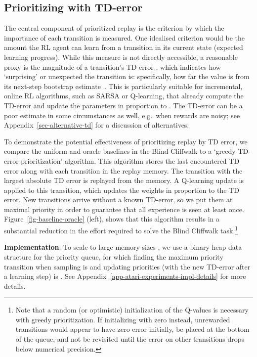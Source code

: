 \documentclass[a4paper]{article}
\begin{document}
\subsection{Prioritizing with TD-error}
The central component of prioritized replay is the criterion by which the importance of each transition is measured. 
One idealised criterion would be the amount the RL agent
can learn from a transition in its current state (expected learning progress). 
While this measure is not directly accessible, a reasonable proxy is the magnitude of 
a transition's TD error , which indicates how `surprising' or unexpected the transition is: specifically, how far the value is from its next-step bootstrap estimate~\citep{gen-sweeping}.
This is particularly suitable for incremental, online RL algorithms, such as SARSA or Q-learning, that already compute the TD-error and update
the parameters in proportion to .
The TD-error can be a poor estimate in some circumstances as well, e.g.~when rewards are noisy; 
see Appendix~\ref{sec-alternative-td} for a discussion of alternatives.


To demonstrate the potential effectiveness of prioritizing replay by TD error, 
we compare the uniform and oracle baselines in the Blind Cliffwalk to 
a `greedy TD-error prioritization' algorithm. This algorithm stores the last encountered TD error along with each transition in the replay memory. The transition with the largest absolute TD error is replayed from the memory. A Q-learning update is applied to this transition, which updates the weights in proportion to the TD error. 
New transitions arrive without a known TD-error, so we put them at maximal priority in order to guarantee that
all experience is seen at least once. 
Figure~\ref{fig-baseline-oracle} (left), shows that this algorithm results in a substantial reduction in the effort required to solve the Blind Cliffwalk task.\footnote{
Note that a random (or optimistic) initialization of the Q-values is necessary with greedy prioritization.
If initializing with zero instead, unrewarded transitions would appear to have zero error initially, be placed at the bottom of the queue, and not be revisited until the error on other transitions drops below numerical precision.
}

{\bf Implementation}: To scale to large memory sizes ,
we use a binary heap data structure for the priority queue, for which 
finding the maximum priority transition when sampling is 
and updating priorities (with the new TD-error after a learning step) is .
See Appendix~\ref{app-atari-experiments-impl-details} for more details.
\end{document}
